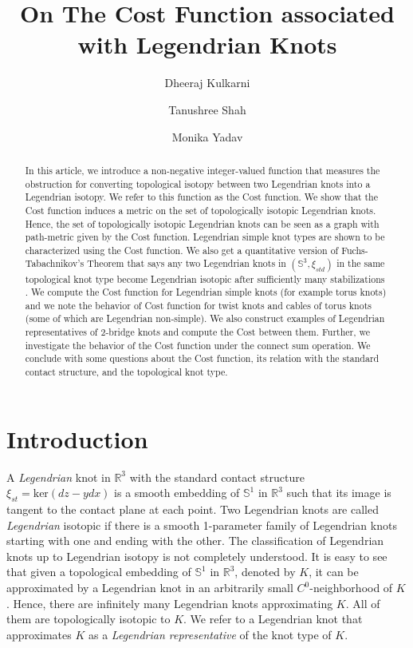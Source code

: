 \documentclass[11pt]{amsart}
\title[Cost Function]{On The Cost Function associated with Legendrian Knots}
\author{Dheeraj Kulkarni}\email{dheeraj@iiserb.ac.in}\address{Department of Mathematics, Indian Institute of Science Education and Research, Bhopal, India}
\author{Tanushree Shah} \email{tanushrees@cmi.ac.in}\address{Chennai Mathematical Institute, India}
\author{Monika Yadav} \email{monika18@iiserb.ac.in}\address{Department of Mathematics, Indian Institute of Science Education and Research, Bhopal, India}
\numberwithin{equation}{section}
\theoremstyle{plain}
\theoremstyle{definition}
\theoremstyle{remark} \newtheorem{remark}[equation]{Remark}
\theoremstyle{remark} \newtheorem{observation}[equation]{Observation}
\newcommand{\R}{\mathbb{R}}
\begin{document}
\begin{abstract} In this article, we introduce a non-negative integer-valued function that measures 
the obstruction for converting topological isotopy between two Legendrian knots into a Legendrian 
isotopy. We refer to this function as the Cost function. We show that the Cost function induces a metric on the set of topologically isotopic Legendrian knots. Hence, the set of topologically isotopic 
Legendrian knots can be seen as a graph with path-metric given by the Cost function. Legendrian simple 
knot types are shown to be characterized using the Cost function. We also get a quantitative version of Fuchs-Tabachnikov's Theorem that says any two Legendrian knots in $(\mathbb{S}^3,\xi_{std})$ in the same topological knot type become Legendrian isotopic after sufficiently many stabilizations \cite{FT}. 
We compute the Cost function for Legendrian simple knots (for example torus knots) and we note the behavior of Cost function for twist knots and cables of torus knots (some of which are Legendrian non-simple). We also construct examples of Legendrian representatives of 2-bridge knots and compute the Cost between them. Further, we investigate the behavior of the Cost function under the 
connect sum operation. We conclude with some questions about the Cost function, its relation with the standard contact structure, and the topological knot type.
\end{abstract}


\maketitle
\tableofcontents

\section{Introduction}

A \emph{Legendrian} knot in $\R^3 $ with the standard contact structure $\xi_{st} = \text{ker}(dz-ydx) $ is a smooth
embedding of $\mathbb{S}^1 $ in $\R^3 $ such that its image is tangent to the contact plane at each point. Two
Legendrian knots are called \emph{Legendrian} isotopic if there is a smooth 1-parameter family of Legendrian knots starting with one and ending with the other. 
The classification of Legendrian knots up to Legendrian isotopy is not completely understood. It is easy to see that given a topological embedding of $\mathbb{S}^1$ in $\R^3 $, denoted by $K$, it can be approximated by a Legendrian knot in an arbitrarily small $C^0 $-neighborhood of $K$.
Hence, there are infinitely many Legendrian knots approximating $K$. All of them are topologically isotopic to $K$. We refer to a Legendrian knot that approximates $ K$ as a \emph{Legendrian representative} of the knot type of $K$.
\end{document}
